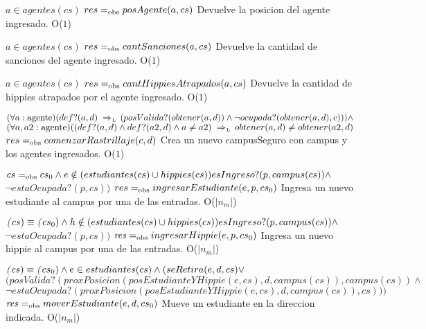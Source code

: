  {$a \in agentes(cs)$}
 {$res =_{\mathrm{obs}} posAgente(a, cs)$}
 {Devuelve la posicion del agente ingresado.}
 {O($1$)}
 {}
 
 {$a \in agentes(cs)$}
 {$res =_{\mathrm{obs}} cantSanciones(a, cs)$}
 {Devuelve la cantidad de sanciones del agente ingresado.}
 {O($1$)}
 {}
 
 {$a \in agentes(cs)$}
 {$res =_{\mathrm{obs}} cantHippiesAtrapados(a, cs)$}
 {Devuelve la cantidad de hippies atrapados por el agente ingresado.}
 {O($1$)}
 {}
 

{$(\paratodo{agente}{a})(def?(a, d) \impluego (posValida?(obtener(a, d)) \land \neg ocupada?(obtener(a, d), c))) \land $\\$ (\paratodo{agente}{a, a2}) ((def?(a, d) \land def?(a2, d) \land a \neq a2) \impluego obtener(a, d) \neq obtener(a2, d)$}
{$res =_{\mathrm{obs}} comenzarRastrillaje(c, d)$}
{Crea un nuevo campusSeguro con campus y los agentes ingresados.}
{O($1$)}
{}
 
{$cs =_{\mathrm{obs}} cs_0 \land e \notin (estudiantes(cs) \cup hippies(cs)) esIngreso?(p, campus(cs)) \land $\\$\neg estaOcupada?(p, cs))$}
{$res =_{\mathrm{obs}} ingresarEstudiante(e, p, cs_0)$}
{Ingresa un nuevo estudiante al campus por una de las entradas.}
{O($|n_m|$)}
{}

{$\text{\textit{(}}cs) \equiv \text{\textit{(}}cs_0) \land h \notin (estudiantes(cs) \cup hippies(cs)) esIngreso?(p, campus(cs)) \land $\\$\neg estaOcupada?(p, cs))$}
{$\text{\textit{res}} =_{\mathrm{obs}} ingresarHippie(e, p, cs_0)$}
{Ingresa un nuevo hippie al campus por una de las entradas.}
{O($|n_m|$)}
{}

{$\text{\textit{(}}cs) \equiv \text{\textit{(}}cs_0) \land e \in estudiantes(cs) \land (seRetira(e, d, cs) \lor $\\$ (posValida?(proxPosicion(posEstudianteYHippie(e, cs), d, campus(cs)), campus(cs)) \land $\\$ \neg estaOcupada?(proxPosicion(posEstudianteYHippie(e, cs), d, campus(cs)), cs)))$}
{$\text{\textit{res}} =_{\mathrm{obs}} moverEstudiante(e, d, cs_0)$}
{Mueve un estudiante en la direccion indicada.}
{O($|n_m|$)}
{}

